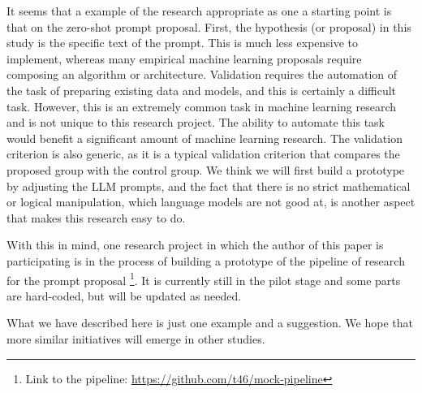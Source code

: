 It seems that a example of the research appropriate as one a starting point is that on the zero-shot prompt proposal. First, the hypothesis (or proposal) in this study is the specific text of the prompt. This is much less expensive to implement, whereas many empirical machine learning proposals require composing an algorithm or architecture. Validation requires the automation of the task of preparing existing data and models, and this is certainly a difficult task. However, this is an extremely common task in machine learning research and is not unique to this research project. The ability to automate this task would benefit a significant amount of machine learning research. The validation criterion is also generic, as it is a typical validation criterion that compares the proposed group with the control group. We think we will first build a prototype by adjusting the LLM prompts, and the fact that there is no strict mathematical or logical manipulation, which language models are not good at, is another aspect that makes this research easy to do.

With this in mind, one research project in which the author of this paper is participating is in the process of building a prototype of the pipeline of research for the prompt proposal \footnote{
Link to the pipeline: \href{https://github.com/t46/mock-pipeline}{https://github.com/t46/mock-pipeline}
}. It is currently still in the pilot stage and some parts are hard-coded, but will be updated as needed.

What we have described here is just one example and a suggestion. We hope that more similar initiatives will emerge in other studies.


